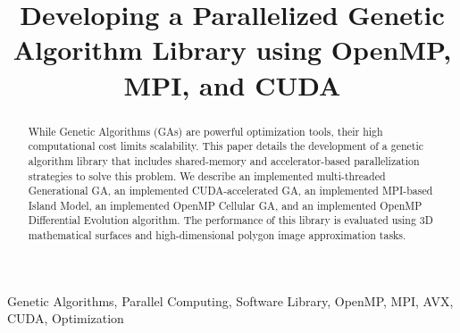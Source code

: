 \documentclass[conference]{IEEEtran}
\begin{document}
    \title{Developing a Parallelized Genetic Algorithm Library using OpenMP, MPI, and CUDA\\}

    \author{
        \and
        \and
        \and
    }

    \maketitle

    \begin{abstract}
        While Genetic Algorithms (GAs) are powerful optimization tools, their high computational cost limits scalability. This paper details the development of a genetic algorithm library that includes shared-memory and accelerator-based parallelization strategies to solve this problem. We describe an implemented multi-threaded Generational GA, an implemented CUDA-accelerated GA, an implemented MPI-based Island Model, an implemented OpenMP Cellular GA, and an implemented OpenMP Differential Evolution algorithm. The performance of this library is evaluated using 3D mathematical surfaces and high-dimensional polygon image approximation tasks.
    \end{abstract}

    \begin{IEEEkeywords}
        Genetic Algorithms, Parallel Computing, Software Library, OpenMP, MPI, AVX, CUDA, Optimization
    \end{IEEEkeywords}
\end{document}
